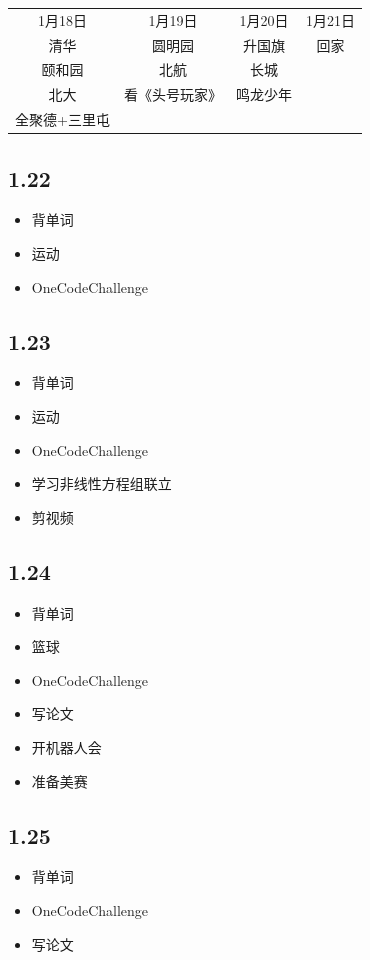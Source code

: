\documentclass[UTF8]{ctexart}
\begin{document}
\begin{tabular}[pos]{cccc}
    1月18日       & 1月19日        & 1月20日  & 1月21日 \\
    清华          & 圆明园         & 升国旗   & 回家    \\
    颐和园        & 北航           & 长城     &         \\
    北大          & 看《头号玩家》 & 鸣龙少年 &         \\
    全聚德+三里屯 &                &          &
\end{tabular}

\subsection*{1.22}
\begin{itemize}
    \item 背单词
    \item 运动
    \item OneCodeChallenge
\end{itemize}

\subsection*{1.23}
\begin{itemize}
    \item 背单词
    \item 运动
    \item OneCodeChallenge
    \item 学习非线性方程组联立
    \item 剪视频
\end{itemize}

\subsection*{1.24}
\begin{itemize}
    \item 背单词
    \item 篮球
    \item OneCodeChallenge
    \item 写论文
    \item 开机器人会
    \item 准备美赛
\end{itemize}

\subsection*{1.25}
\begin{itemize}
    \item 背单词
    \item OneCodeChallenge
    \item 写论文
\end{itemize}
\end{document}
